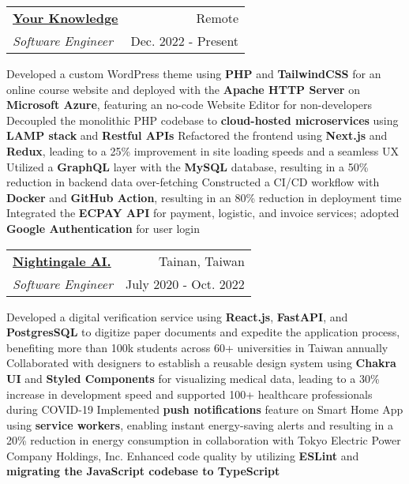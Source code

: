 \newcommand{\resumeExpEntry}[4]{
  \vspace{5pt}\item
    \begin{tabular*}{0.97\textwidth}{l@{\extracolsep{\fill}}r}
      \textbf{#1} & \small #2 \\
      \textit{#3} & \small #4 \\
    \end{tabular*}\vspace{-5pt}
}

\resumeExpEntry
{\href{https://yourknowledge.online}{Your Knowledge}}
{Remote}
{Software Engineer}
{Dec. 2022 - Present}
{
  \resumeItemListStart
    \resumeItem
    {Developed a custom WordPress theme using \textbf{PHP} and \textbf{TailwindCSS} for an online course website and deployed with the \textbf{Apache HTTP Server} on \textbf{Microsoft Azure}, featuring an no-code Website Editor for non-developers}
    \resumeItem
    {Decoupled the monolithic PHP codebase to \textbf{cloud-hosted microservices} using \textbf{LAMP stack} and \textbf{Restful APIs}}
    \resumeItem
    {Refactored the frontend using \textbf{Next.js} and \textbf{Redux}, leading to a 25\% improvement in site loading speeds and a seamless UX}
    \resumeItem
    {Utilized a \textbf{GraphQL} layer with the \textbf{MySQL} database, resulting in a 50\% reduction in backend data over-fetching}
    \resumeItem
    {Constructed a CI/CD workflow with \textbf{Docker} and \textbf{GitHub Action}, resulting in an 80\% reduction in deployment time}
    \resumeItem
    {Integrated the \textbf{ECPAY API} for payment, logistic, and invoice services; adopted \textbf{Google Authentication} for user login}
  \resumeItemListEnd
}

\resumeExpEntry
{\href{https://19gale.ai}{Nightingale AI.}}
{Tainan, Taiwan}
{Software Engineer}
{July 2020 - Oct. 2022}
{
  \resumeItemListStart
    \resumeItem
    {Developed a digital verification service using \textbf{React.js}, \textbf{FastAPI}, and \textbf{PostgresSQL} to digitize paper documents and expedite the application process, benefiting more than 100k students across 60+ universities in Taiwan annually}
    \resumeItem
    {Collaborated with designers to establish a reusable design system using \textbf{Chakra UI} and \textbf{Styled Components} for visualizing medical data, leading to a 30\% increase in development speed and supported 100+ healthcare professionals during COVID-19}
    \resumeItem
    {Implemented \textbf{push notifications} feature on Smart Home App using \textbf{service workers}, enabling instant energy-saving alerts and resulting in a 20\% reduction in energy consumption in collaboration with Tokyo Electric Power Company Holdings, Inc.}
    \resumeItem
    {Enhanced code quality by utilizing \textbf{ESLint} and \textbf{migrating the JavaScript codebase to TypeScript}}
  \resumeItemListEnd
}

